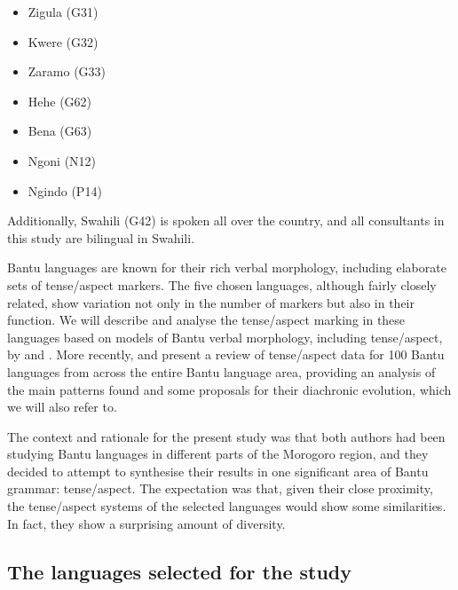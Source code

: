 \documentclass[output=paper,
            colorlinks, citecolor=brown
            ,draftmode
		  ]{langscibook}
\begin{document}
\begin{itemize}
\item 
Zigula (G31)

\item 
Kwere (G32)

\item 
Zaramo (G33)

\item 
Hehe (G62)

\item 
Bena (G63)

\item 
Ngoni (N12)

\item 
Ngindo (P14)

\end{itemize}

Additionally, Swahili (G42) is spoken all over the country, and all consultants in this study are bilingual in Swahili. 



Bantu languages are known for their rich verbal morphology, including elaborate sets of tense/aspect markers. The five chosen languages, although fairly closely related, show variation not only in the number of markers but also in their function. We will describe and analyse the tense/aspect marking in these languages based on models of Bantu verbal morphology, including tense/aspect, by \citet{Meeussen1967} and \citet{Guthrie1967-1971}. More recently, \citet{Nurse2008} and \citet{NurseDevos2019} present a review of tense/aspect data for 100 Bantu languages from across the entire Bantu language area, providing an analysis of the main patterns found and some proposals for their diachronic evolution, which we will also refer to.



The context and rationale for the present study was that both authors had been studying Bantu languages in different parts of the Morogoro region, and they decided to attempt to synthesise their results in one significant area of Bantu grammar: tense/aspect. The expectation was that, given their close proximity, the tense/aspect systems of the selected languages would show some similarities. In fact, they show a surprising amount of diversity.


\subsection{The languages selected for the study}\label{sec:petzell:1.2}
\end{document}
